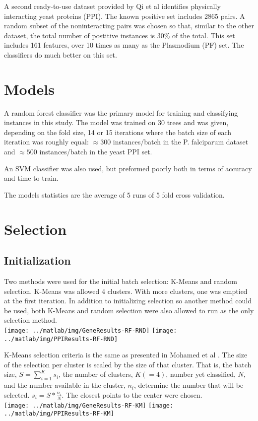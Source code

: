 \documentclass[10pt,a4pape r]{article}
\begin{document}
A second ready-to-use dataset provided by Qi et al\cite{qi} identifies physically interacting yeast proteins (PPI). The known positive set includes 2865 pairs. A random subset of the noninteracting pairs was chosen so that, similar to the other dataset, the total number of postitive instances is 30\% of the total. This set includes 161 features, over 10 times as many as the Plasmodium (PF) set. The classifiers do much better on this set.

\section{Models}
A random forest classifier\cite{rf} was the primary model for training and classifying instances in this study. The model was trained on 30 trees and was given, depending on the fold size, 14 or 15 iterations where the batch size of each iteration was roughly equal: $\approx 300$ instances/batch in the P. falciparum dataset and $\approx 500$ instances/batch in the yeast PPI set.

An SVM classifier was also used, but preformed poorly both in terms of accuracy and time to train.  

The models statistics are the average of 5 runs of 5 fold cross validation.

\section{Selection}
\subsection{Initialization}
Two methods were used for the initial batch selection: K-Means and random selection. K-Means was allowed 4 clusters. With more clusters, one was emptied at the first iteration. In addition to initializing selection so another method could be used, both K-Means and random selection were also allowed to run as the only selection method. \\
\texttt{[image: ../matlab/img/GeneResults-RF-RND]} \texttt{[image: ../matlab/img/PPIResults-RF-RND]}

K-Means selection criteria is the same as presented in Mohamed et al \cite{mohamed}. The size of the selection per cluster is scaled by the size of that cluster. That is, the batch size, $S = \sum_{i=1}^{K} s_{i}$, the number of clusters, $K(=4)$, number yet classified, $N$, and the number available in the cluster, $n_i$, determine the number that will be selected.  $s_i = S * \frac{n_i}{N}$. The closest points to the center were chosen.\\
\texttt{[image: ../matlab/img/GeneResults-RF-KM]} \texttt{[image: ../matlab/img/PPIResults-RF-KM]}
\end{document}
